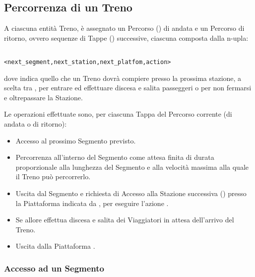 	\subsection{Percorrenza di un Treno}
	
	A ciascuna entità Treno, è assegnato un Percorso () di andata e un Percorso di ritorno, ovvero sequenze di Tappe () successive, ciascuna composta dalla n-upla:
				\begin{center}
					\begin{verbatim}
						       <next_segment,next_station,next_platfom,action>
					\end{verbatim}
				\end{center}
dove  indica quello che un Treno dovrà compiere presso la prossima stazione, a scelta tra , per entrare ed effettuare discesa e salita passeggeri o  per non fermarsi e oltrepassare la Stazione.

Le operazioni effettuate sono, per ciascuna Tappa del Percorso corrente (di andata o di ritorno):
				\begin{itemize} 
					\item Accesso al prossimo Segmento  previsto.
					\item Percorrenza all'interno del Segmento come attesa finita di durata proporzionale alla lunghezza del Segmento e alla velocità massima alla quale il Treno può percorrerlo.
					\item Uscita dal Segmento e richiesta di Accesso alla Stazione successiva () presso la Piattaforma indicata da , per eseguire l'azione .
					\item Se  allore effettua discesa e salita dei Viaggiatori in attesa dell'arrivo del Treno.
					\item Uscita dalla Piattaforma .
				\end{itemize}
	
		\subsubsection{Accesso ad un Segmento}
		
